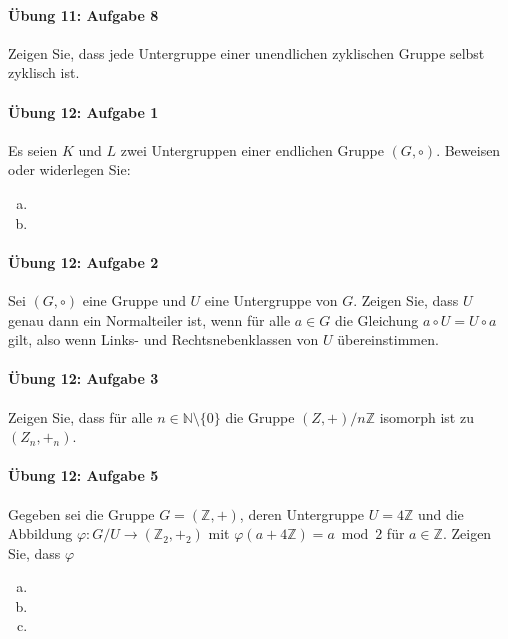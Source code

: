 \documentclass
[
  draft    = true,
  fontsize = 11pt,
  parskip  = half-,
  BCOR     = 0pt,
  DIV      = 11,
  ngerman,
  dvipsnames
]
{scrartcl}
\begin{document}
\paragraph{Übung 11: Aufgabe 8}
Zeigen Sie, dass jede Untergruppe einer unendlichen zyklischen Gruppe selbst zyklisch ist.

\paragraph{Übung 12: Aufgabe 1}
Es seien $K$ und $L$ zwei Untergruppen einer endlichen Gruppe $(G,\circ)$.
Beweisen oder widerlegen Sie:
\begin{enumerate}[a)]
  \item
  \item
\end{enumerate}

\paragraph{Übung 12: Aufgabe 2}
Sei $(G, \circ)$ eine Gruppe und $U$ eine Untergruppe von $G$. Zeigen Sie, dass
$U$ genau dann ein Normalteiler ist, wenn für alle $a\in G$ die Gleichung
$a\circ U=U\circ a$ gilt, also wenn Links- und Rechtsnebenklassen von $U$
übereinstimmen.

\paragraph{Übung 12: Aufgabe 3}
Zeigen Sie, dass für alle $n\in\mathbb{N}\setminus\{0\}$ die Gruppe
$(Z,+)/n\mathbb{Z}$ isomorph ist zu $(Z_n, +_n)$.

\paragraph{Übung 12: Aufgabe 5}
Gegeben sei die Gruppe $G=(\mathbb{Z},+)$, deren Untergruppe $U=4\mathbb{Z}$
und die Abbildung $\varphi:G/U\rightarrow(\mathbb{Z}_2 ,+_2)$ mit
$\varphi(a+4\mathbb{Z})=a\bmod2$ für $a\in\mathbb{Z}$. Zeigen Sie, dass
$\varphi$
\begin{enumerate}[a)]
  \item
  \item
  \item
\end{enumerate}
\end{document}
